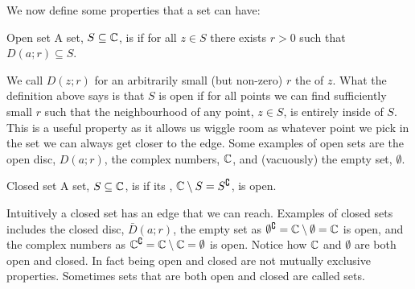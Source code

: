 \documentclass{article}
\newcommand{\discOpen}[2]{D\left({#1}; {#2}\right)}
\newcommand{\discClosed}[2]{\bar{D}\left({#1}; {#2}\right)}
\begin{document}
    We now define some properties that a set can have:
    \begin{definition}{Open set}{}
        A set, \(S\subseteq\mathbb{C}\), is  if for all \(z\in S\) there exists \(r > 0\) such that \(\discOpen{a}{r} \subseteq S\).
    \end{definition}
    We call \(D(z; r)\) for an arbitrarily small (but non-zero) \(r\) the  of \(z\).
    What the definition above says is that \(S\) is open if for all points we can find sufficiently small \(r\) such that the neighbourhood of any point, \(z\in S\), is entirely inside of \(S\).
    This is a useful property as it allows us wiggle room as whatever point we pick in the set we can always get closer to the edge.
    Some examples of open sets are the open disc, \(\discOpen{a}{r}\), the complex numbers, \(\mathbb{C}\), and (vacuously) the empty set, \(\emptyset\).
    
    \begin{definition}{Closed set}{}
        A set, \(S\subseteq\mathbb{C}\), is  if its , \(\mathbb{C}\setminus S = S^\complement\), is open.
    \end{definition}
    Intuitively a closed set has an edge that we can reach.
    Examples of closed sets includes the closed disc, \(\discClosed{a}{r}\), the empty set as \(\emptyset^\complement = \mathbb{C}\setminus\emptyset = \mathbb{C}\) is open, and the complex numbers as \(\mathbb{C}^\complement = \mathbb{C}\setminus\mathbb{C} = \emptyset\) is open.
    Notice how \(\mathbb{C}\) and \(\emptyset\) are both open and closed.
    In fact being open and closed are not mutually exclusive properties.
    Sometimes sets that are both open and closed are called  sets.
    
\end{document}
